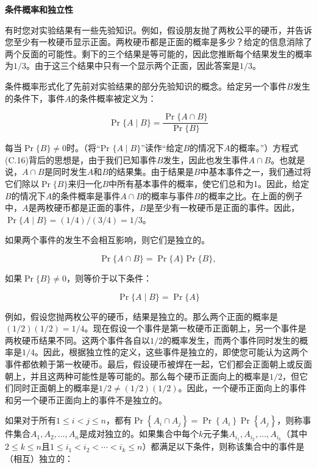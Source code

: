 \documentclass[lang=cn,newtx,10pt,scheme=chinese]{elegantbook}
\begin{document}
\textbf{条件概率和独立性}

有时您对实验结果有一些先验知识。例如，假设朋友抛了两枚公平的硬币，并告诉您至少有一枚硬币显示正面。两枚硬币都是正面的概率是多少？给定的信息消除了两个反面的可能性。剩下的三个结果是等可能的，因此您推断每个结果发生的概率为$1/3$。由于这三个结果中只有一个显示两个正面，因此答案是$1/3$。

条件概率形式化了先前对实验结果的部分先验知识的概念。给定另一个事件$B$发生的条件下，事件$A$的条件概率被定义为：

$$
\operatorname{Pr}\{A \mid B\}=\frac{\operatorname{Pr}\{A \cap B\}}{\operatorname{Pr}\{B\}}
$$

每当$\operatorname{Pr}\{B\} \neq 0$时。（将“Pr $\{A \mid B\}$”读作“给定$B$的情况下$A$的概率。”）方程式(C.16)背后的思想是，由于我们已知事件$B$发生，因此也发生事件$A \cap B$。也就是说，$A \cap B$是同时发生$A$和$B$的结果集。由于结果是$B$中基本事件之一，我们通过将它们除以$\operatorname{Pr}\{B\}$来归一化$B$中所有基本事件的概率，使它们总和为1。因此，给定$B$的情况下$A$的条件概率是事件$A \cap B$的概率与事件$B$的概率之比。在上面的例子中，$A$是两枚硬币都是正面的事件，$B$是至少有一枚硬币是正面的事件。因此，$\operatorname{Pr}\{A \mid B\}=(1 / 4) /(3 / 4)=1 / 3$。

如果两个事件的发生不会相互影响，则它们是独立的。

$$
\operatorname{Pr}\{A \cap B\}=\operatorname{Pr}\{A\} \operatorname{Pr}\{B\} \text {, }
$$

如果$\operatorname{Pr}\{B\} \neq 0$，则等价于以下条件：

$$
\operatorname{Pr}\{A \mid B\}=\operatorname{Pr}\{A\}
$$

例如，假设您抛两枚公平的硬币，结果是独立的。那么两个正面的概率是$(1 / 2)(1 / 2)=1 / 4$。现在假设一个事件是第一枚硬币正面朝上，另一个事件是两枚硬币结果不同。这两个事件各自以$1/2$的概率发生，而两个事件同时发生的概率是$1/4$。因此，根据独立性的定义，这些事件是独立的，即使您可能认为这两个事件都依赖于第一枚硬币。最后，假设硬币被焊在一起，它们都会正面朝上或反面朝上，并且这两种可能性是等可能的。那么每个硬币正面向上的概率是$1/2$，但它们同时正面朝上的概率是$1/2 \neq(1 / 2)(1 / 2)$。因此，一个硬币正面向上的事件和另一个硬币正面向上的事件不是独立的。

如果对于所有$1 \leq i<j \leq n$，都有$\operatorname{Pr}\left\{A_i \cap A_j\right\}=\operatorname{Pr}\left\{A_i\right\} \operatorname{Pr}\left\{A_j\right\}$，则称事件集合$A_1, A_2, \ldots, A_n$是成对独立的。如果集合中每个$k$元子集$A_{i_1}, A_{i_2}, \ldots, A_{i_k}$（其中$2 \leq k \leq n$且$1 \leq i_1<i_2<\cdots<i_k \leq n$）都满足以下条件，则称该集合中的事件是（相互）独立的：
\end{document}
